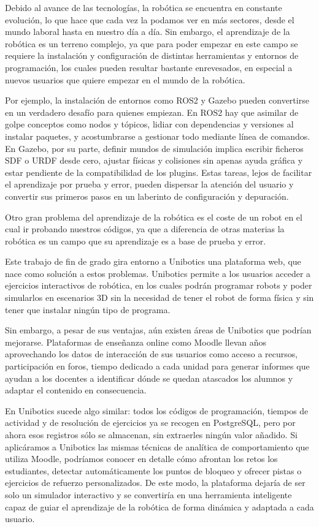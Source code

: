 \documentclass[a4paper, 12pt]{book}
\begin{document}
Debido al avance de las tecnologías, la robótica se encuentra en constante evolución, lo que hace que cada vez la podamos ver en más sectores, desde el mundo laboral hasta en nuestro día a día. Sin embargo, el aprendizaje de la robótica es un terreno complejo, ya que para poder empezar en este campo se requiere la instalación y configuración de distintas herramientas y entornos de programación, los cuales pueden resultar bastante enrevesados, en especial a nuevos usuarios que quiere empezar en el mundo de la robótica.

Por ejemplo, la instalación de entornos como ROS2 y Gazebo \cite{rico2025concise} pueden convertirse en un verdadero desafío para quienes empiezan. En ROS2 hay que asimilar de golpe conceptos como nodos y tópicos, lidiar con dependencias y versiones al instalar paquetes, y acostumbrarse a gestionar todo mediante línea de comandos. En Gazebo, por su parte, definir mundos de simulación implica escribir ficheros SDF o URDF desde cero, ajustar físicas y colisiones sin apenas ayuda gráfica y estar pendiente de la compatibilidad de los plugins. Estas tareas, lejos de facilitar el aprendizaje por prueba y error, pueden dispersar la atención del usuario y convertir sus primeros pasos en un laberinto de configuración y depuración.

Otro gran problema del aprendizaje de la robótica es el coste de un robot en el cual ir probando nuestros códigos, ya que a diferencia de otras materias la robótica es un campo que su aprendizaje es a base de prueba y error.

Este trabajo de fin de grado gira entorno a Unibotics \cite{uniboticsWebsite} una plataforma web, que nace como solución a estos problemas. Unibotics permite a los usuarios acceder a ejercicios interactivos de robótica, en los cuales podrán programar robots y poder simularlos en escenarios 3D sin la necesidad de tener el robot de forma física y sin tener que instalar ningún tipo de programa.

Sin embargo, a pesar de sus ventajas, aún existen áreas de Unibotics que podrían mejorarse. Plataformas de enseñanza online como Moodle \cite{einhardt2016moodle} llevan años aprovechando los datos de interacción de sus usuarios como acceso a recursos, participación en foros, tiempo dedicado a cada unidad para generar informes que ayudan a los docentes a identificar dónde se quedan atascados los alumnos y adaptar el contenido en consecuencia. 

En Unibotics sucede algo similar: todos los códigos de programación, tiempos de actividad y de resolución de ejercicios ya se recogen en PostgreSQL, pero por ahora esos registros sólo se almacenan, sin extraerles ningún valor añadido. Si aplicáramos a Unibotics las mismas técnicas de analítica de comportamiento que utiliza Moodle, podríamos conocer en detalle cómo afrontan los retos los estudiantes, detectar automáticamente los puntos de bloqueo y ofrecer pistas o ejercicios de refuerzo personalizados. De este modo, la plataforma dejaría de ser solo un simulador interactivo y se convertiría en una herramienta inteligente capaz de guiar el aprendizaje de la robótica de forma dinámica y adaptada a cada usuario.
\end{document}
